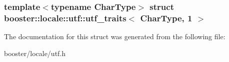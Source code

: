 \subsubsection*{template$<$typename Char\-Type$>$ struct booster\-::locale\-::utf\-::utf\-\_\-traits$<$ Char\-Type, 1 $>$}



\-The documentation for this struct was generated from the following file\-:\begin{DoxyCompactItemize}
\item 
booster/locale/utf.\-h\end{DoxyCompactItemize}
